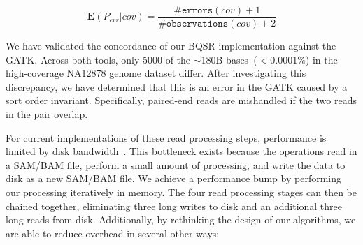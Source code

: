 \documentclass{acm_proc_article-sp}
\begin{document}
\begin{enumerate}
\begin{equation}
\label{eqn:bqsrerr}
\mathbf{E}(P_{err}|{cov}) = \frac{\texttt{\#errors}(cov) + 1}{\texttt{\#observations}(cov) + 2}
\end{equation}

We have validated the concordance of our BQSR implementation against the GATK. Across both tools, only 5000
of the $\sim$180B bases~($<0.0001\%$) in the high-coverage NA12878 genome dataset differ. After investigating
this discrepancy, we have determined that this is an error in the GATK caused by a sort order invariant. Specifically,
paired-end reads are mishandled if the two reads in the pair overlap.
\end{enumerate}

For current implementations of these read processing steps, performance is limited by disk
bandwidth~\cite{diao15}. This bottleneck exists because the operations read in a SAM/BAM file, perform
a small amount of processing, and write the data to disk as a new SAM/BAM file. We achieve a
performance bump by performing our processing iteratively in memory. The four read processing stages
can then be chained together, eliminating three long writes to disk and an additional three long reads
from disk. Additionally, by rethinking the design of our algorithms, we are able to reduce overhead in
several other ways:
\end{document}

